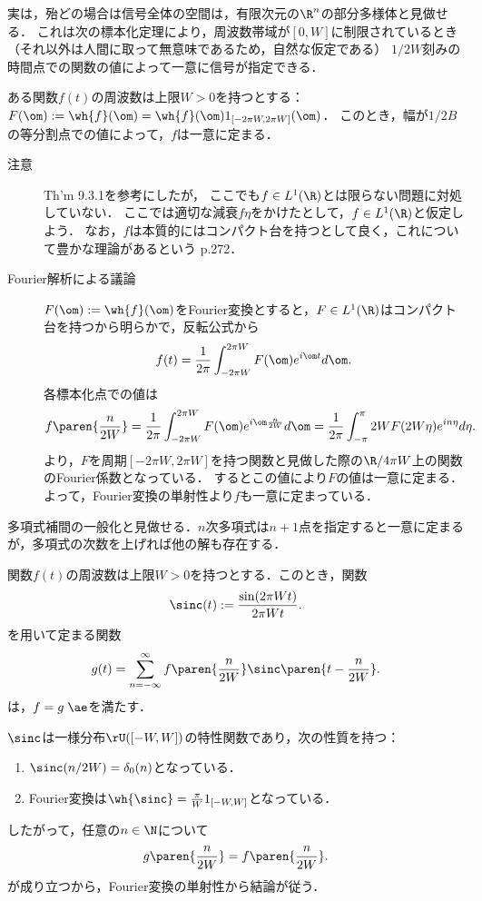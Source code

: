 \documentclass[uplatex,dvipdfmx]{jsreport}
\begin{document}
実は，殆どの場合は信号全体の空間は，有限次元の$\R^n$の部分多様体と見做せる．
これは次の標本化定理により，周波数帯域が$[0,W]$に制限されているとき（それ以外は人間に取って無意味であるため，自然な仮定である）
$1/2W$刻みの時間点での関数の値によって一意に信号が指定できる．

\begin{theorem}
    ある関数$f(t)$の周波数は上限$W>0$を持つとする：$F(\om):=\wh{f}(\om)=\wh{f}(\om)1_{[-2\pi W,2\pi W]}(\om)$．
    このとき，幅が$1/2B$の等分割点での値によって，$f$は一意に定まる．
\end{theorem}
\begin{Proof}\mbox{}
    \begin{description}
        \item[注意] \cite{Cover-Thomas06-ElementsOfInformationTheory} Th'm 9.3.1を参考にしたが，
        ここでも$f\in L^1(\R)$とは限らない問題に対処していない．
        ここでは適切な減衰$f\eta$をかけたとして，$f\in L^1(\R)$と仮定しよう．
        なお，$f$は本質的にはコンパクト台を持つとして良く，これについて豊かな理論があるという\cite{Cover-Thomas06-ElementsOfInformationTheory} p.272．
        \item[Fourier解析による議論] $F(\om):=\wh{f}(\om)$をFourier変換とすると，$F\in L^1(\R)$はコンパクト台を持つから明らかで，反転公式から
        \[f(t)=\frac{1}{2\pi}\int^{2\pi W}_{-2\pi W}F(\om)e^{i\om t}d\om.\]
        各標本化点での値は
        \[f\paren{\frac{n}{2W}}=\frac{1}{2\pi}\int^{2\pi W}_{-2\pi W}F(\om)e^{i\om\frac{n}{2W}}d\om=\frac{1}{2\pi}\int^\pi_{-\pi}2WF(2W\eta)e^{in\eta}d\eta.\]
        より，$F$を周期$[-2\pi W,2\pi W]$を持つ関数と見做した際の$\R/4\pi W$上の関数のFourier係数となっている．
        するとこの値により$F$の値は一意に定まる．よって，Fourier変換の単射性より$f$も一意に定まっている．
    \end{description}
\end{Proof}
\begin{remarks}
    多項式補間の一般化と見做せる．$n$次多項式は$n+1$点を指定すると一意に定まるが，多項式の次数を上げれば他の解も存在する．
\end{remarks}

\begin{proposition}[信号の標本点での値による表示]
    関数$f(t)$の周波数は上限$W>0$を持つとする．このとき，関数
    \[\sinc(t):=\frac{\sin(2\pi Wt)}{2\pi Wt}.\]
    を用いて定まる関数
    \[g(t)=\sum_{n=-\infty}^\infty f\paren{\frac{n}{2W}}\sinc\paren{t-\frac{n}{2W}}.\]
    は，$f=g\;\ae$を満たす．
\end{proposition}
\begin{Proof}
    $\sinc$は一様分布$\rU([-W,W])$の特性関数であり，次の性質を持つ：
    \begin{enumerate}
        \item $\sinc(n/2W)=\delta_0(n)$となっている．
        \item Fourier変換は$\wh{\sinc}=\frac{\pi}{W}1_{[-W,W]}$となっている．
    \end{enumerate}
    したがって，任意の$n\in\N$について
    \[g\paren{\frac{n}{2W}}=f\paren{\frac{n}{2W}}.\]
    が成り立つから，Fourier変換の単射性から結論が従う．
\end{Proof}
\end{document}
